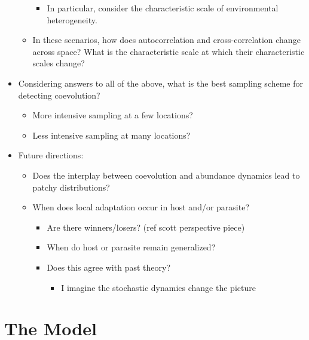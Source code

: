 \documentclass{article}
\begin{document}
\begin{itemize}
\begin{itemize}
    \begin{itemize}
    \tightlist
    \item
      In particular, consider the characteristic scale of environmental
      heterogeneity.
    \end{itemize}
  \item
    In these scenarios, how does autocorrelation and cross-correlation
    change across space? What is the characteristic scale at which their
    characteristic scales change?
  \end{itemize}
\item
  Considering answers to all of the above, what is the best sampling
  scheme for detecting coevolution?

  \begin{itemize}
  \tightlist
  \item
    More intensive sampling at a few locations?
  \item
    Less intensive sampling at many locations?
  \end{itemize}
\item
  Future directions:

  \begin{itemize}
  \tightlist
  \item
    Does the interplay between coevolution and abundance dynamics lead
    to patchy distributions?
  \item
    When does local adaptation occur in host and/or parasite?

    \begin{itemize}
    \tightlist
    \item
      Are there winners/losers? (ref scott perspective piece)
    \item
      When do host or parasite remain generalized?
    \item
      Does this agree with past theory?

      \begin{itemize}
      \tightlist
      \item
        I imagine the stochastic dynamics change the picture
      \end{itemize}
    \end{itemize}
  \end{itemize}
\end{itemize}

\hypertarget{the-model}{%
\section{The Model}\label{the-model}}
\end{document}
